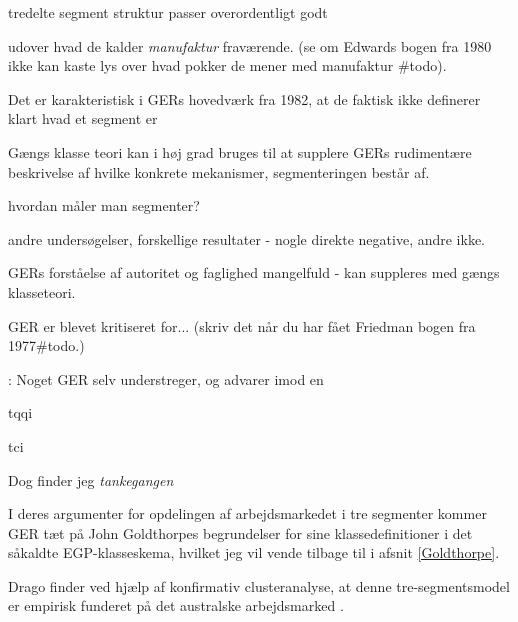 tredelte segment struktur passer overordentligt godt    









 udover hvad de kalder \emph{manufaktur} fraværende. (se om Edwards bogen fra 1980 ikke kan kaste lys over hvad pokker de mener med manufaktur \#todo). 




 Det er karakteristisk i GERs hovedværk fra 1982, at de faktisk ikke definerer klart hvad et segment er




Gængs klasse teori kan i høj grad bruges til at supplere GERs rudimentære beskrivelse af hvilke konkrete mekanismer, segmenteringen består af.  









hvordan måler man segmenter? 

andre undersøgelser, forskellige resultater - nogle direkte negative, andre ikke. 

GERs forståelse af autoritet og faglighed mangelfuld - kan suppleres med gængs klasseteori. 








GER er blevet kritiseret for... (skriv det når du har fået Friedman bogen fra 1977\#todo.)

: Noget GER selv understreger, og advarer imod en 

tqqi	



tci

 Dog finder jeg \emph{tankegangen} 


I deres argumenter for opdelingen af arbejdsmarkedet i tre segmenter kommer GER tæt på John Goldthorpes begrundelser for sine klassedefinitioner i det såkaldte EGP-klasseskema, hvilket jeg vil vende tilbage til i afsnit \ref{Goldthorpe}.




Drago finder ved hjælp af konfirmativ clusteranalyse, at denne tre-segmentsmodel er empirisk funderet på det australske arbejdsmarked \textcite{Drago1995}. 







